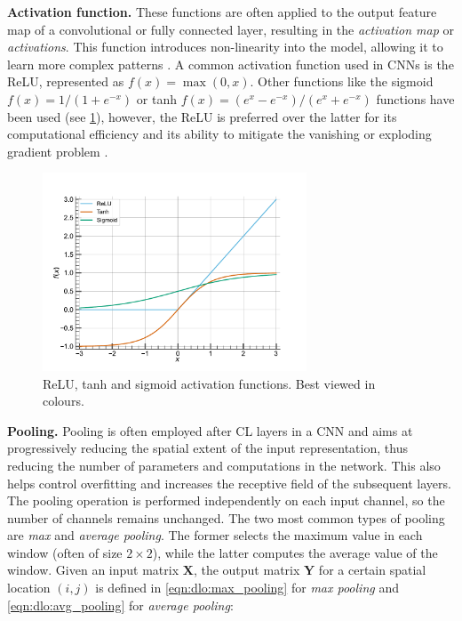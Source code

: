 \noindent \textbf{Activation function.} These functions are often applied to the
output feature map of a convolutional or fully connected layer, resulting in the
\emph{activation map} or \emph{activations}. This function introduces
non-linearity into the model, allowing it to learn more complex patterns
\cite{long2015fully}. A common activation function used in \acp{CNN} is the
\ac{ReLU}, represented as $f(x)=\max(0,x)$. Other functions like the sigmoid
$f(x)=1/(1+e^{-x})$ or tanh $f(x)=(e^{x} -e^{-x})/(e^{x}+e^{-x})$ functions have
been used (see \cref{fig:dlo:activation_functions}), however, the \ac{ReLU} is
preferred over the latter for its computational efficiency and its ability to
mitigate the vanishing or exploding gradient problem
\cite{hochreiter2001gradient,glorot2010understanding}.\\

\begin{figure}[htbp]
  \centering
  \includegraphics[width=0.7\textwidth]{chapter_dlo/assets/activation_functions.pdf}
  \caption{\ac{ReLU}, tanh and sigmoid activation functions. Best viewed in
  colours.}
  \label{fig:dlo:activation_functions}
\end{figure}

\noindent \textbf{Pooling.} Pooling is often employed after \ac{CL} layers in a
\ac{CNN} and aims at progressively reducing the spatial extent of the input
representation, thus reducing the number of parameters and computations in the
network. This also helps control overfitting and increases the receptive field
of the subsequent layers. The pooling operation is performed independently on
each input channel, so the number of channels remains unchanged. The two most
common types of pooling are \emph{max} and \emph{average pooling}. The former
selects the maximum value in each window (often of size $2\times 2$), while the
latter computes the average value of the window. Given an input matrix
$\mathbf{X}$, the output matrix $ \mathbf{Y} $ for a
certain spatial location $(i, j)$ is defined in \cref{eqn:dlo:max_pooling} for
\emph{max pooling} and \cref{eqn:dlo:avg_pooling} for \emph{average pooling}:\\

